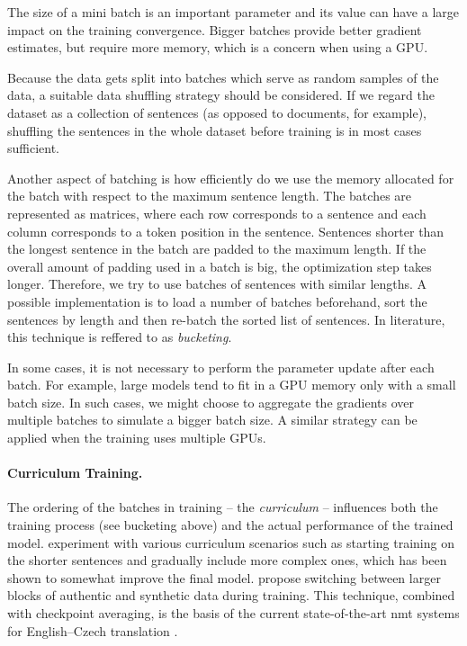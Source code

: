 The size of a mini batch is an important parameter and its value can have a
large impact on the training convergence. Bigger batches provide better
gradient estimates, but require more memory, which is a concern when using a
GPU.

Because the data gets split into batches which serve as random samples of the
data, a suitable data shuffling strategy should be considered. If we regard the
dataset as a collection of sentences (as opposed to documents, for example),
shuffling the sentences in the whole dataset before training is in most cases
sufficient.

Another aspect of batching is how efficiently do we use the memory allocated
for the batch with respect to the maximum sentence length. The batches are
represented as matrices, where each row corresponds to a sentence and each
column corresponds to a token position in the sentence. Sentences shorter than
the longest sentence in the batch are padded to the maximum length. If the
overall amount of padding used in a batch is big, the optimization step takes
longer. Therefore, we try to use batches of sentences with similar lengths. A
possible implementation is to load a number of batches beforehand, sort the
sentences by length and then re-batch the sorted list of sentences. In
literature, this technique is reffered to as \emph{bucketing}.

In some cases, it is not necessary to perform the parameter update after each
batch. For example, large models tend to fit in a GPU memory only with a small
batch size. In such cases, we might choose to aggregate the gradients over
multiple batches to simulate a bigger batch size. A similar strategy can be
applied when the training uses multiple GPUs.

\paragraph{Curriculum Training.} The ordering of the batches in training -- the
\emph{curriculum} -- influences both the training process (see bucketing above)
and the actual performance of the trained
model. \citet{kocmi-bojar-2017-curriculum} experiment with various curriculum
scenarios such as starting training on the shorter sentences and gradually
include more complex ones, which has been shown to somewhat improve the final
model. \citet{popel-etal-2020-transforming} propose switching between larger
blocks of authentic and synthetic data during training. This technique,
combined with checkpoint averaging, is the basis of the current
state-of-the-art \ac{nmt} systems for English--Czech translation
\citep{barrault-etal-2020-findings}. 

